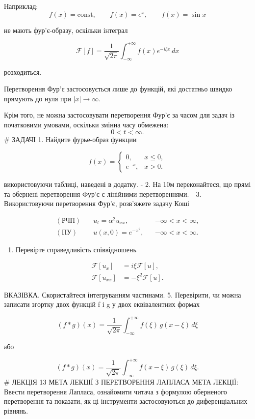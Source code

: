 \documentclass[
  ukrainian,
]{article}
\providecommand{\tightlist}{%
  \setlength{\itemsep}{0pt}\setlength{\parskip}{0pt}}
\begin{document}
Наприклад: \[
f(x)=\text{const}, \qquad f(x)=e^x, \qquad f(x)=\sin x
\]

не мають фур'є-образу, оскільки інтеграл

\[
\mathcal{F}[f] = \frac{1}{\sqrt{2\pi}} \int_{-\infty}^{+\infty} f(x)e^{-i\xi x}\,dx
\]

розходиться.

Перетворення Фур'є застосовується лише до функцій, які достатньо швидко
прямують до нуля при \(|x|\to\infty\).

Крім того, не можна застосовувати перетворення Фур'є за часом для задач
із початковими умовами, оскільки змінна часу обмежена: \[
0 < t < \infty.
\] \# ЗАДАЧІ 1. Найдите фурье-образ функции

\[
f(x)=
\begin{cases}
0, & x \le 0, \\
e^{-x}, & x > 0.
\end{cases}
\]

використовуючи таблиці, наведені в додатку. - 2. На 10м переконайтеся,
що прямі та обернені перетворення Фур'є є лінійними перетвореннями. - 3.
Використовуючи перетворення Фур'є, розв'яжете задачу Коші

\[
\begin{aligned}
(\text{РЧП})\quad & u_t = \alpha^2 u_{xx}, && -\infty < x < \infty,\\
(\text{ПУ})\quad & u(x,0)=e^{-x^2}, && -\infty < x < \infty.
\end{aligned}
\]

\begin{enumerate}
\def\labelenumi{\arabic{enumi}.}
\setcounter{enumi}{3}
\tightlist
\item
  Перевірте справедливість співвідношень
\end{enumerate}

\[
\begin{aligned}
\mathcal{F}\left[u_{x}\right] &= i\xi \mathcal{F}\left[u\right], \\
\mathcal{F}\left[u_{xx}\right] &= -\xi^{2} \mathcal{F}\left[u\right].
\end{aligned}
\]

ВКАЗІВКА. Скористайтеся інтегруванням частинами. 5. Перевірити, чи можна
записати згортку двох функцій f і g у двох еквівалентних формах

\[
(f * g)(x) = \frac{1}{\sqrt{2\pi}} \int_{-\infty}^{+\infty} f(\xi)\, g(x - \xi)\, d\xi
\]

або

\[
(f * g)(x) = \frac{1}{\sqrt{2\pi}} \int_{-\infty}^{+\infty} f(x-\xi)\, g(\xi)\, d\xi.
\] \# ЛЕКЦІЯ 13 МЕТА ЛЕКЦІЇ З ПЕРЕТВОРЕННЯ ЛАПЛАСА МЕТА ЛЕКЦІЇ: Ввести
перетворення Лапласа, ознайомити читача з формулою оберненого
перетворення та показати, як ці інструменти застосовуються до
диференціальних рівнянь.
\end{document}
